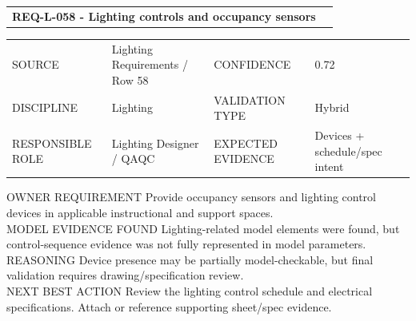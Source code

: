 \documentclass[10pt,letterpaper]{article}
\newcommand{\smalllabel}[1]{{\scriptsize\textcolor{emaMuted}{\MakeUppercase{#1}}}}
\newcommand{\badge}[3]{\tcbox[on line,colback=#2,colframe=#2,boxrule=0pt,arc=2mm,left=5pt,right=5pt,top=2pt,bottom=2pt]{\scriptsize\textbf{\textcolor{#3}{#1}}}}
\newcommand{\reviewbadge}{\badge{Needs Human Review}{emaAmberBg}{emaAmber}}
\begin{document}
\begin{tcolorbox}[colback=white,colframe=emaAmberBg,boxrule=0.9pt,borderline west={3pt}{0pt}{emaAmber}]
\begin{tabularx}{\textwidth}{X r}
{\large\bfseries\textcolor{emaNavy}{REQ-L-058 - Lighting controls and occupancy sensors}} & \reviewbadge \\
\end{tabularx}
\begin{tabularx}{\textwidth}{p{1.25in}X p{1.1in}X}
\smalllabel{Source} & Lighting Requirements / Row 58 & \smalllabel{Confidence} & 0.72 \\
\smalllabel{Discipline} & Lighting & \smalllabel{Validation Type} & Hybrid \\
\smalllabel{Responsible Role} & Lighting Designer / QAQC & \smalllabel{Expected Evidence} & Devices + schedule/spec intent \\
\end{tabularx}
\smalllabel{Owner Requirement} Provide occupancy sensors and lighting control devices in applicable instructional and support spaces.\\[3pt]
\smalllabel{Model Evidence Found} Lighting-related model elements were found, but control-sequence evidence was not fully represented in model parameters.\\[3pt]
\smalllabel{Reasoning} Device presence may be partially model-checkable, but final validation requires drawing/specification review.\\[3pt]
\smalllabel{Next Best Action} Review the lighting control schedule and electrical specifications. Attach or reference supporting sheet/spec evidence.
\end{tcolorbox}
\end{document}
